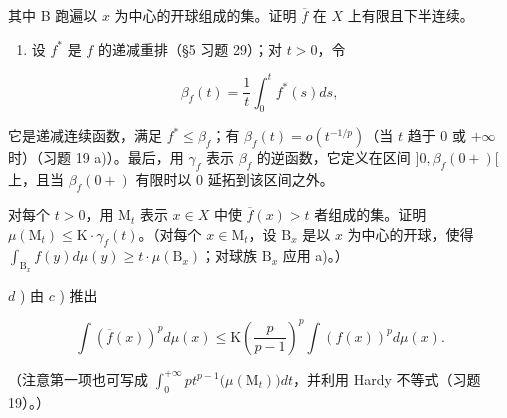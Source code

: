 其中 B 跑遍以 \(x\) 为中心的开球组成的集。证明 \(\overline{f}\) 在 \(X\) 上有限且下半连续。

\begin{enumerate}
\def\labelenumi{\alph{enumi})}
\setcounter{enumi}{2}
\tightlist
\item
  设 \(f^*\) 是 \(f\) 的递减重排（§5 习题 29）；对 \(t > 0\)，令
\end{enumerate}

\[
\beta_ {f} (t) = \frac {1}{t} \int_ {0} ^ {t} f ^ {*} (s) d s,
\]

它是递减连续函数，满足 \(f^* \leqslant \beta_f\)；有 \(\beta_f(t) = o(t^{-1/p})\)（当 \(t\) 趋于 0 或 \(+\infty\) 时）（习题 19 a)）。最后，用 \(\gamma_f\) 表示 \(\beta_f\) 的逆函数，它定义在区间 \(]0, \beta_f(0+)[\) 上，且当 \(\beta_f(0+)\) 有限时以 0 延拓到该区间之外。

对每个 \(t > 0\)，用 \(\mathrm{M}_t\) 表示 \(x \in X\) 中使 \(\overline{f}(x) > t\) 者组成的集。证明 \(\mu(\mathrm{M}_t) \leqslant \mathrm{K} \cdot \gamma_f(t)\)。（对每个 \(x \in \mathrm{M}_t\)，设 \(\mathrm{B}_x\) 是以 \(x\) 为中心的开球，使得 \(\int_{\mathrm{B}_x} f(y) d\mu(y) \geqslant t \cdot \mu(\mathrm{B}_x)\)；对球族 \(\mathrm{B}_x\) 应用 a)。）

\(d\) ) 由 \(c\) ) 推出

\[
\int \left(\overline {{f}} (x)\right) ^ {p} d \mu (x) \leqslant \mathrm{K} \left(\frac {p}{p - 1}\right) ^ {p} \int \left(f (x)\right) ^ {p} d \mu (x).
\]

（注意第一项也可写成 \(\int_0^{+\infty}pt^{p - 1}\big(\mu (\mathrm{M}_t)\big)dt\)，并利用 Hardy 不等式（习题 19）。）
